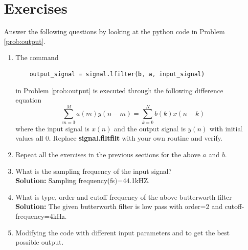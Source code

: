 \documentclass[journal,12pt,twocolumn]{IEEEtran}
\newcommand{\solution}{\noindent \textbf{Solution: }}
\providecommand{\brak}[1]{\ensuremath{\left(#1\right)}}
\numberwithin{equation}{section}
\renewcommand\thesection{\arabic{section}}
\begin{document}
\section{Exercises}

Answer the following questions by looking at the python code in Problem \ref{prob:output}.
\begin{enumerate}[label=\thesection.\arabic*]
\item
The command
\begin{lstlisting}
	output_signal = signal.lfilter(b, a, input_signal)
	\end{lstlisting}
in Problem \ref{prob:output} is executed through the following difference equation
\begin{equation}
\label{eq:iir_filter_gen}
 \sum _{m=0}^{M}a\brak{m}y\brak{n-m}=\sum _{k=0}^{N}b\brak{k}x\brak{n-k}
\end{equation}
%
where the input signal is $x(n)$ and the output signal is $y(n)$ with initial values all 0. Replace
\textbf{signal.filtfilt} with your own routine and verify.
%
\item Repeat all the exercises in the previous sections for the above $a$ and $b$.

\item What is the sampling frequency of the input signal?
\\
\solution
Sampling frequency(fs)=44.1kHZ.
\item
What is type, order and  cutoff-frequency of the above butterworth filter
\\
\solution
The given butterworth filter is low pass with order=2 and cutoff-frequency=4kHz.
%
\item
Modifying the code with different input parameters and to get the best possible output.
%
\end{enumerate}
\end{document}
